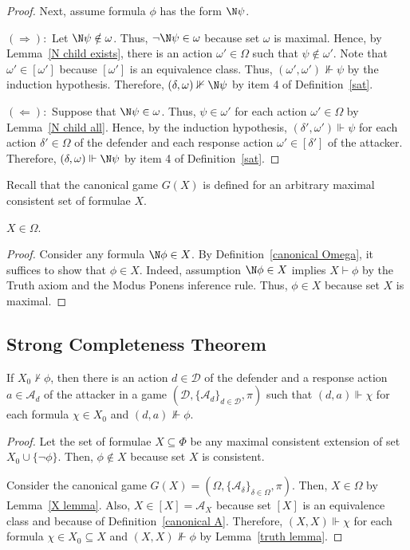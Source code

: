 \documentclass[letterpaper]{article}
\begin{document}
\begin{proof}
\vspace{2mm}
Next, assume formula $\phi$ has the form $\N\psi$. 

\noindent$(\Rightarrow):$  Let $\N\psi\notin \omega$. Thus, $\neg\N\psi\in\omega$ because set $\omega$ is maximal. Hence, by Lemma~\ref{N child exists}, there is an action $\omega'\in\Omega$ such that $\psi\notin\omega'$. Note that $\omega'\in[\omega']$ because $[\omega']$ is an equivalence class. Thus, $(\omega',\omega')\nVdash\psi$ by the induction hypothesis. Therefore, $(\delta,\omega)\nVdash\N\psi$ by item 4 of Definition~\ref{sat}.

\noindent$(\Leftarrow):$ Suppose that $\N\psi\in \omega$. Thus, $\psi\in \omega'$ for each action $\omega'\in\Omega$ by Lemma~\ref{N child all}. Hence, by the induction hypothesis, $(\delta',\omega')\Vdash\psi$ for each action $\delta'\in\Omega$ of the defender and each response action $\omega'\in[\delta']$ of the attacker. Therefore, $(\delta,\omega)\Vdash\N\psi$ by item 4 of Definition~\ref{sat}.
\end{proof}

Recall that the canonical game $G(X)$ is defined for an arbitrary maximal consistent set of formulae $X$.

\begin{lemma}\label{X lemma}
$X\in \Omega$.
\end{lemma}
\begin{proof}
Consider any formula $\N\phi\in X$. By Definition~\ref{canonical Omega}, it suffices to show that $\phi\in X$. Indeed, assumption $\N\phi\in X$ implies $X\vdash\phi$ by the Truth axiom and the Modus Ponens inference rule. Thus, $\phi\in X$ because set $X$ is maximal. 
\end{proof}

\subsection{Strong Completeness Theorem}

\begin{theorem}
If $X_0\nvdash\phi$, then there is an action $d\in\mathcal{D}$ of the defender and a response action $a\in\mathcal{A}_d$ of the attacker in a game $(\mathcal{D},\{\mathcal{A}_d\}_{d\in\mathcal{D}},\pi)$ such that $(d,a)\Vdash\chi$ for each formula $\chi\in X_0$ and $(d,a)\nVdash\phi$.
\end{theorem}
\begin{proof}
Let the set of formulae $X\subseteq\Phi$ be any maximal consistent extension of set $X_0\cup\{\neg\phi\}$. Then, $\phi\notin X$ because set $X$ is consistent.

Consider the canonical game $G(X)=(\Omega,\{\mathcal{A}_\delta\}_{\delta\in\Omega},\pi)$. Then, $X\in\Omega$ by Lemma~\ref{X lemma}. Also, $X\in[X]=\mathcal{A}_X$ because set $[X]$ is an equivalence class and because of Definition~\ref{canonical A}. Therefore, $(X,X)\Vdash\chi$ for each formula $\chi\in X_0\subseteq X$ and $(X,X)\nVdash\phi$ by Lemma~\ref{truth lemma}. 
\end{proof}
\end{document}
